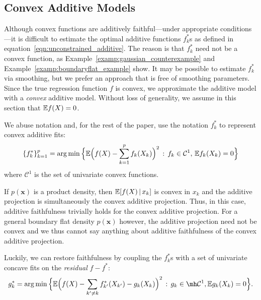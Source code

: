 \subsection{Convex Additive Models}

Although convex functions are additively faithful---under appropriate conditions---it is difficult to
estimate the optimal additive functions $f^*_k$s as defined in
equation~\eqref{eqn:unconstrained_additive}.  The reason is that $f^*_k$ need not be
a convex function, as Example~\ref{examp:gaussian_counterexample} and Example~\ref{examp:boundaryflat_example} 
show. It may be possible to estimate $f^*_k$ via smoothing, but we prefer an approach that is free of smoothing parameters. 
Since the true regression function $f$ is convex, we approximate the additive model with a \emph{convex} additive model. Without loss of generality, we assume in this section that ${\mathbb E} f(X) = 0$. 

We abuse notation and, for the rest of the paper, use the notation $f^*_k$ to represent convex additive fits:
\begin{equation}
\label{eqn:convex_additive}
\{ f^*_k \}_{k=1}^p = \arg\min \Big \{ 
    {\mathbb E}\Bigl( f(X) - \sum_{k=1}^p f_k(X_k) \Bigr)^2 \,:\, f_k \in \mathcal{C}^1, \, {\mathbb E} f_k(X_k) = 0 \Big \}
\end{equation}
where $\mathcal{C}^1$ is the set of univariate convex functions. 

If $p(\mathbf{x})$ is a product density, then ${\mathbb E}[ f(X) {\,|\,} x_k]$
is convex in $x_k$ and the additive projection is simultaneously the
convex additive projection. Thus, in this case, additive faithfulness
trivially holds for the convex additive projection.  For a general
boundary flat density $p(\mathbf{x})$ however, the additive projection
need not be convex and we thus cannot say anything about additive
faithfulness of the convex additive projection.

Luckily, we can restore faithfulness by coupling the $f^*_k$s with a set of univariate concave fits on the \emph{residual} $f - f^*$:
\begin{equation}
\label{eqn:concave_postprocess}
g^*_k = \arg\min \Big\{
   \E\Bigl( f(X) - \sum_{k' \neq k} f^*_{k'}(X_{k'}) - g_k(X_k) \Bigr)^2
    \,:\, g_k \in \mh \mathcal{C}^1, \E g_k(X_k) = 0 
  \Big\}.
\end{equation}


